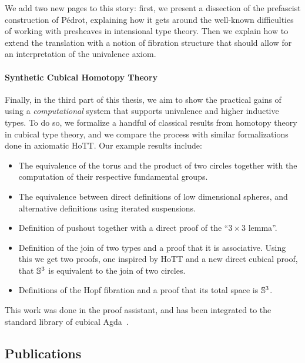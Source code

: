We add two new pages to this story: first, we present a dissection of 
the prefascist construction of Pédrot, explaining how it gets around the well-known 
difficulties of working with presheaves in intensional type theory.
% 
Then we explain how to extend the translation with a notion of 
fibration structure that should allow for an interpretation of the univalence
axiom.

\paragraph{Synthetic Cubical Homotopy Theory}
% 
Finally, in the third part of this thesis, we aim to show the practical 
gains of using a \emph{computational} system that supports univalence and 
higher inductive types. 
% 
To do so, we formalize a handful of classical results from homotopy theory 
in cubical type theory, and we compare the process with similar formalizations
done in axiomatic HoTT.
% 
Our example results include:
%
\begin{itemize}
\item The equivalence of the torus and the product of two circles together with the
  computation of their respective fundamental groups.
\item The equivalence between direct definitions of low dimensional
  spheres, and alternative definitions using iterated suspensions.
\item Definition of pushout together with a direct proof of the ``$3
  \times 3$ lemma''.
\item Definition of the join of two types and a proof that it is
  associative. Using this we get two proofs, one
  inspired by HoTT and a new direct cubical proof, that $\mathbb{S}^3$ is
  equivalent to the join of two circles.
\item Definitions of the Hopf fibration and a proof that its total
  space is $\mathbb{S}^3$.
\end{itemize}

This work was done in the \Agda proof assistant, and has been integrated to the
standard library of cubical Agda~.

\subsection{Publications}

